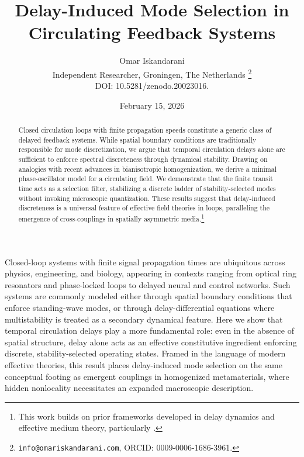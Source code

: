\documentclass[11pt,a4paper]{article}
\newcommand{\paperdoi}{10.5281/zenodo.20023016}
\begin{document}
    \title{Delay-Induced Mode Selection in Circulating Feedback Systems}
    \author{%
        Omar Iskandarani\\
        \small Independent Researcher, Groningen, The Netherlands%
        \thanks{\texttt{info@omariskandarani.com}, ORCID: 0009-0006-1686-3961.} \\
        \small DOI: \paperdoi.%
    }
    \date{February 15, 2026}

    \maketitle
    \begin{abstract}
        Closed circulation loops with finite propagation speeds constitute a generic class of delayed feedback systems. While spatial boundary conditions are traditionally responsible for mode discretization, we argue that temporal circulation delays alone are sufficient to enforce spectral discreteness through dynamical stability. Drawing on analogies with recent advances in bianisotropic homogenization, we derive a minimal phase-oscillator model for a circulating field. We demonstrate that the finite transit time acts as a selection filter, stabilizing a discrete ladder of stability-selected modes without invoking microscopic quantization. These results suggest that delay-induced discreteness is a universal feature of effective field theories in loops, paralleling the emergence of cross-couplings in spatially asymmetric media.\footnote{This work builds on prior frameworks developed in delay dynamics and effective medium theory, particularly \cite{Willis2012, Yanchuk2017}.}
    \end{abstract}

    \par
    \noindent
    \normalfont\normalsize\justifying
    Closed-loop systems with finite signal propagation times are ubiquitous across physics, engineering, and biology, appearing in contexts ranging from optical ring resonators and phase-locked loops to delayed neural and control networks. Such systems are commonly modeled either through spatial boundary conditions that enforce standing-wave modes, or through delay-differential equations where multistability is treated as a secondary dynamical feature.
    Here we show that temporal circulation delays play a more fundamental role: even in the absence of spatial structure, delay alone acts as an effective constitutive ingredient enforcing discrete, stability-selected operating states.
     Framed in the language of modern effective theories, this result places delay-induced mode selection on the same conceptual footing as emergent couplings in homogenized metamaterials, where hidden nonlocality necessitates an expanded macroscopic description.
\end{document}
